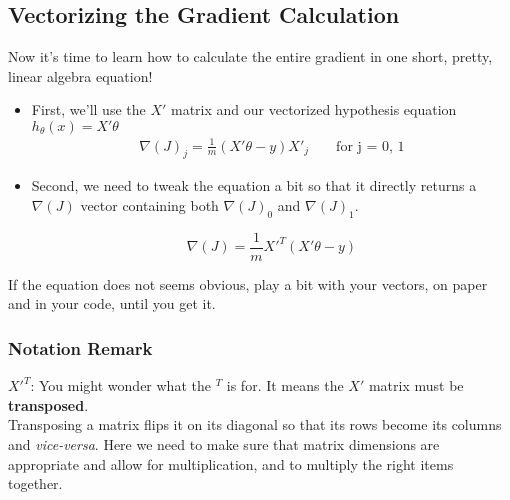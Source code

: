 \subsection*{Vectorizing the Gradient Calculation}
Now it's time to learn how to calculate the entire gradient in one short, pretty, linear algebra equation!  
\begin{itemize}
    \item First, we'll use the $X'$ matrix and our vectorized hypothesis equation $h_{\theta}(x)=X'\theta$
    $$
    \begin{matrix}
    \nabla(J)_j = \frac{1}{m} (X'\theta - y)X'_{j} & & \text{ for j = 0, 1}
    \end{matrix}
    $$
    
    \item Second, we need to tweak the equation a bit so that it directly returns a $\nabla(J)$ vector containing both $\nabla(J)_0$ and $\nabla(J)_1$.
    
    $$
    \nabla(J) = \frac{1}{m} {X'}^T(X'\theta - y)    
    $$
\end{itemize}
If the equation does not seems obvious, play a bit with your vectors, on paper and in your code, until you get it.\\

\subsubsection*{Notation Remark}
${X'}^T$: You might wonder what the $^T$ is for.
It means the $X'$ matrix must be \textbf{transposed}.\\
\newline
Transposing a matrix flips it on its diagonal so that its rows become its columns and \textit{vice-versa}.
Here we need to make sure that matrix dimensions are appropriate and allow for multiplication, and to multiply the right items together.